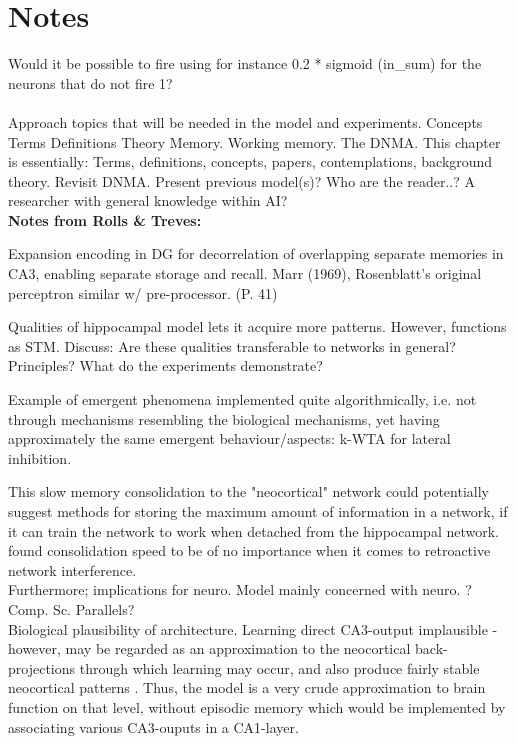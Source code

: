 \section{Notes}

Would it be possible to fire using for instance 0.2 * sigmoid (in\_sum) for the neurons that do not fire 1?
\\\\

Approach topics that will be needed in the model and experiments.
Concepts
Terms
Definitions
Theory
Memory. Working memory.
The DNMA.
This chapter is essentially: Terms, definitions, concepts, papers, contemplations, background theory. Revisit DNMA.
Present previous model(s)?
Who are the reader..? A researcher with general knowledge within AI?
\\

\textbf{Notes from Rolls \& Treves:}

Expansion encoding in DG for decorrelation of overlapping separate memories in CA3, enabling separate storage and recall. Marr (1969), Rosenblatt's original perceptron similar w/ pre-processor. (P. 41)

Qualities of hippocampal model lets it acquire more patterns. However, functions as STM. Discuss: Are these qualities transferable to networks in general? Principles? What do the experiments demonstrate?

Example of emergent phenomena implemented quite algorithmically, i.e. not through mechanisms resembling the biological mechanisms, yet having approximately the same emergent behaviour/aspects: k-WTA for lateral inhibition.

This slow memory consolidation to the "neocortical" network could potentially suggest methods for storing the maximum amount of information in a network, if it can train the network to work when detached from the hippocampal network. \cite{French2001} found consolidation speed to be of no importance when it comes to retroactive network interference.
\\
Furthermore; implications for neuro. Model mainly concerned with neuro. ? Comp. Sc. Parallels?
\\

Biological plausibility of \citep{McClelland1995} architecture. Learning direct CA3-output implausible - however, may be regarded as an approximation to the neocortical back-projections through which learning may occur, and also produce fairly stable neocortical patterns \citep{Rolls1998chpt6}. Thus, the model is a very crude approximation to brain function on that level, without episodic memory which would be implemented by associating various CA3-ouputs in a CA1-layer.

\cleardoublepage